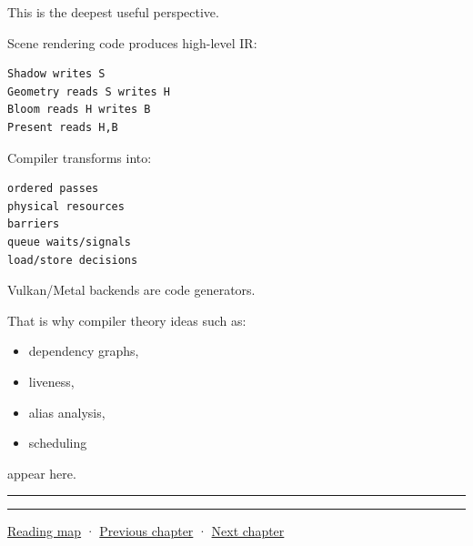 This is the deepest useful perspective.

Scene rendering code produces high-level IR:

\begin{verbatim}
Shadow writes S
Geometry reads S writes H
Bloom reads H writes B
Present reads H,B
\end{verbatim}

Compiler transforms into:

\begin{verbatim}
ordered passes
physical resources
barriers
queue waits/signals
load/store decisions
\end{verbatim}

Vulkan/Metal backends are code generators.

That is why compiler theory ideas such as:

\begin{itemize}
\tightlist
\item
  dependency graphs,
\item
  liveness,
\item
  alias analysis,
\item
  scheduling
\end{itemize}

appear here.

\begin{center}\rule{0.5\linewidth}{0.5pt}\end{center}

\begin{center}\rule{0.5\linewidth}{0.5pt}\end{center}

\hyperref[volume-reading-map]{Reading map} · \hyperref[06-engine-ii-ch042-from-cartridge-bytes-to-a-reproducible-machine]{Previous chapter} · \hyperref[06-engine-ii-ch044-cross-backend-conversion-and-agreement]{Next chapter}
